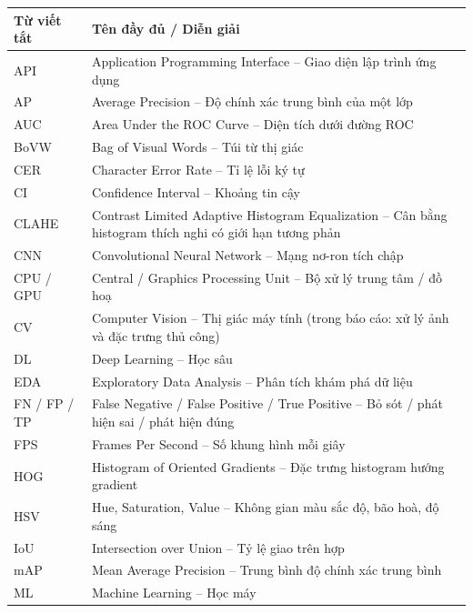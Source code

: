 
\begingroup
{}
\renewcommand{\arraystretch}{1.3}
\begin{longtable}{|p{3.0cm}|p{11.6cm}|}
    \hline
    \centering\arraybackslash\textbf{Từ viết tắt} & \centering\arraybackslash\textbf{Tên đầy đủ / Diễn giải} \\
    \hline
    \endhead
    API & Application Programming Interface -- Giao diện lập trình ứng dụng \\ \hline
    AP & Average Precision -- Độ chính xác trung bình của một lớp \\ \hline
    AUC & Area Under the ROC Curve -- Diện tích dưới đường ROC \\ \hline
    BoVW & Bag of Visual Words -- Túi từ thị giác \\ \hline
    CER & Character Error Rate -- Tỉ lệ lỗi ký tự \\ \hline
    CI & Confidence Interval -- Khoảng tin cậy \\ \hline
    CLAHE & Contrast Limited Adaptive Histogram Equalization -- Cân bằng histogram thích nghi có giới hạn tương phản \\ \hline
    CNN & Convolutional Neural Network -- Mạng nơ-ron tích chập \\ \hline
    CPU / GPU & Central / Graphics Processing Unit -- Bộ xử lý trung tâm / đồ hoạ \\ \hline
    CV & Computer Vision -- Thị giác máy tính (trong báo cáo: xử lý ảnh và đặc trưng thủ công) \\ \hline
    DL & Deep Learning -- Học sâu \\ \hline
    EDA & Exploratory Data Analysis -- Phân tích khám phá dữ liệu \\ \hline
    FN / FP / TP & False Negative / False Positive / True Positive -- Bỏ sót / phát hiện sai / phát hiện đúng \\ \hline
    FPS & Frames Per Second -- Số khung hình mỗi giây \\ \hline
    HOG & Histogram of Oriented Gradients -- Đặc trưng histogram hướng gradient \\ \hline
    HSV & Hue, Saturation, Value -- Không gian màu sắc độ, bão hoà, độ sáng \\ \hline
    IoU & Intersection over Union -- Tỷ lệ giao trên hợp \\ \hline
    mAP & Mean Average Precision -- Trung bình độ chính xác trung bình \\ \hline
    ML & Machine Learning -- Học máy \\ \hline

\end{longtable}
